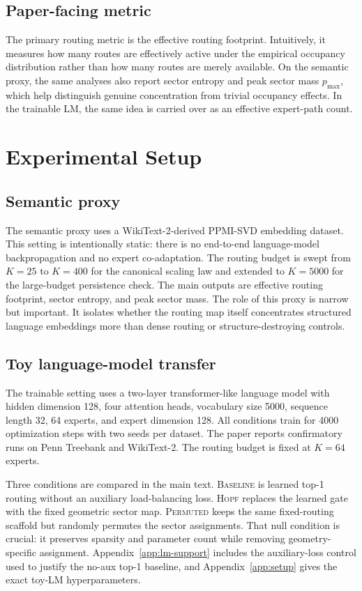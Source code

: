 \documentclass[11pt,letterpaper]{article}
\begin{document}
\subsection{Paper-facing metric}
The primary routing metric is the effective routing footprint. Intuitively, it measures how many routes are effectively active under the empirical occupancy distribution rather than how many routes are merely available. On the semantic proxy, the same analyses also report sector entropy and peak sector mass $p_{\max}$, which help distinguish genuine concentration from trivial occupancy effects. In the trainable LM, the same idea is carried over as an effective expert-path count.

\section{Experimental Setup}
\subsection{Semantic proxy}
The semantic proxy uses a WikiText-2-derived PPMI-SVD embedding dataset. This setting is intentionally static: there is no end-to-end language-model backpropagation and no expert co-adaptation. The routing budget is swept from $K=25$ to $K=400$ for the canonical scaling law and extended to $K=5000$ for the large-budget persistence check. The main outputs are effective routing footprint, sector entropy, and peak sector mass. The role of this proxy is narrow but important. It isolates whether the routing map itself concentrates structured language embeddings more than dense routing or structure-destroying controls.

\subsection{Toy language-model transfer}
The trainable setting uses a two-layer transformer-like language model with hidden dimension 128, four attention heads, vocabulary size 5000, sequence length 32, 64 experts, and expert dimension 128. All conditions train for 4000 optimization steps with two seeds per dataset. The paper reports confirmatory runs on Penn Treebank and WikiText-2. The routing budget is fixed at $K=64$ experts.

Three conditions are compared in the main text. \textsc{Baseline} is learned top-1 routing without an auxiliary load-balancing loss. \textsc{Hopf} replaces the learned gate with the fixed geometric sector map. \textsc{Permuted} keeps the same fixed-routing scaffold but randomly permutes the sector assignments. That null condition is crucial: it preserves sparsity and parameter count while removing geometry-specific assignment. Appendix~\ref{app:lm-support} includes the auxiliary-loss control used to justify the no-aux top-1 baseline, and Appendix~\ref{app:setup} gives the exact toy-LM hyperparameters.
\end{document}
